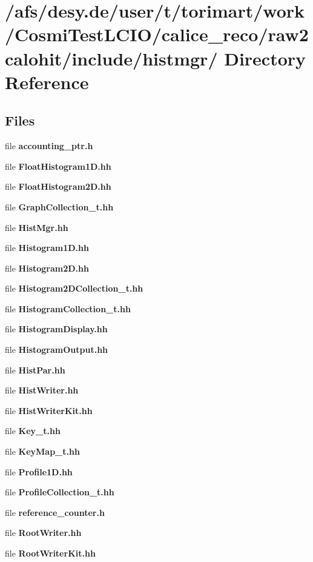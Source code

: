 \section{/afs/desy.de/user/t/torimart/work/CosmiTestLCIO/calice\_\-reco/raw2calohit/include/histmgr/ Directory Reference}
\label{dir_d1763872167e3f09767ff9f0a7ab897a}
\subsection*{Files}
\begin{DoxyCompactItemize}
\item 
file {\bfseries accounting\_\-ptr.h}
\item 
file {\bfseries FloatHistogram1D.hh}
\item 
file {\bfseries FloatHistogram2D.hh}
\item 
file {\bfseries GraphCollection\_\-t.hh}
\item 
file {\bfseries HistMgr.hh}
\item 
file {\bfseries Histogram1D.hh}
\item 
file {\bfseries Histogram2D.hh}
\item 
file {\bfseries Histogram2DCollection\_\-t.hh}
\item 
file {\bfseries HistogramCollection\_\-t.hh}
\item 
file {\bfseries HistogramDisplay.hh}
\item 
file {\bfseries HistogramOutput.hh}
\item 
file {\bfseries HistPar.hh}
\item 
file {\bfseries HistWriter.hh}
\item 
file {\bfseries HistWriterKit.hh}
\item 
file {\bfseries Key\_\-t.hh}
\item 
file {\bfseries KeyMap\_\-t.hh}
\item 
file {\bfseries Profile1D.hh}
\item 
file {\bfseries ProfileCollection\_\-t.hh}
\item 
file {\bfseries reference\_\-counter.h}
\item 
file {\bfseries RootWriter.hh}
\item 
file {\bfseries RootWriterKit.hh}
\end{DoxyCompactItemize}
